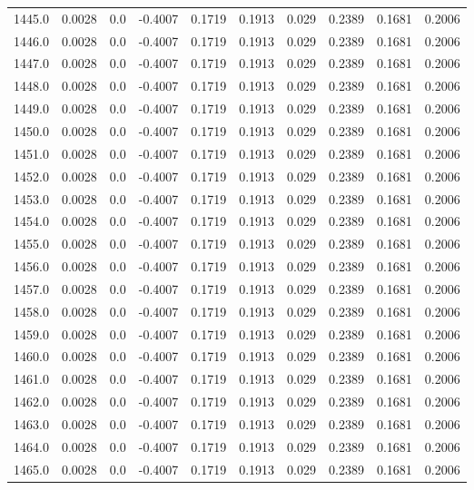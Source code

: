 \begin{longtable}{lrrrrrrrrr}
1445.0 & 0.0028 & 0.0 & -0.4007 & 0.1719 & 0.1913 & 0.029 & 0.2389 & 0.1681 & 0.2006 \\
1446.0 & 0.0028 & 0.0 & -0.4007 & 0.1719 & 0.1913 & 0.029 & 0.2389 & 0.1681 & 0.2006 \\
1447.0 & 0.0028 & 0.0 & -0.4007 & 0.1719 & 0.1913 & 0.029 & 0.2389 & 0.1681 & 0.2006 \\
1448.0 & 0.0028 & 0.0 & -0.4007 & 0.1719 & 0.1913 & 0.029 & 0.2389 & 0.1681 & 0.2006 \\
1449.0 & 0.0028 & 0.0 & -0.4007 & 0.1719 & 0.1913 & 0.029 & 0.2389 & 0.1681 & 0.2006 \\
1450.0 & 0.0028 & 0.0 & -0.4007 & 0.1719 & 0.1913 & 0.029 & 0.2389 & 0.1681 & 0.2006 \\
1451.0 & 0.0028 & 0.0 & -0.4007 & 0.1719 & 0.1913 & 0.029 & 0.2389 & 0.1681 & 0.2006 \\
1452.0 & 0.0028 & 0.0 & -0.4007 & 0.1719 & 0.1913 & 0.029 & 0.2389 & 0.1681 & 0.2006 \\
1453.0 & 0.0028 & 0.0 & -0.4007 & 0.1719 & 0.1913 & 0.029 & 0.2389 & 0.1681 & 0.2006 \\
1454.0 & 0.0028 & 0.0 & -0.4007 & 0.1719 & 0.1913 & 0.029 & 0.2389 & 0.1681 & 0.2006 \\
1455.0 & 0.0028 & 0.0 & -0.4007 & 0.1719 & 0.1913 & 0.029 & 0.2389 & 0.1681 & 0.2006 \\
1456.0 & 0.0028 & 0.0 & -0.4007 & 0.1719 & 0.1913 & 0.029 & 0.2389 & 0.1681 & 0.2006 \\
1457.0 & 0.0028 & 0.0 & -0.4007 & 0.1719 & 0.1913 & 0.029 & 0.2389 & 0.1681 & 0.2006 \\
1458.0 & 0.0028 & 0.0 & -0.4007 & 0.1719 & 0.1913 & 0.029 & 0.2389 & 0.1681 & 0.2006 \\
1459.0 & 0.0028 & 0.0 & -0.4007 & 0.1719 & 0.1913 & 0.029 & 0.2389 & 0.1681 & 0.2006 \\
1460.0 & 0.0028 & 0.0 & -0.4007 & 0.1719 & 0.1913 & 0.029 & 0.2389 & 0.1681 & 0.2006 \\
1461.0 & 0.0028 & 0.0 & -0.4007 & 0.1719 & 0.1913 & 0.029 & 0.2389 & 0.1681 & 0.2006 \\
1462.0 & 0.0028 & 0.0 & -0.4007 & 0.1719 & 0.1913 & 0.029 & 0.2389 & 0.1681 & 0.2006 \\
1463.0 & 0.0028 & 0.0 & -0.4007 & 0.1719 & 0.1913 & 0.029 & 0.2389 & 0.1681 & 0.2006 \\
1464.0 & 0.0028 & 0.0 & -0.4007 & 0.1719 & 0.1913 & 0.029 & 0.2389 & 0.1681 & 0.2006 \\
1465.0 & 0.0028 & 0.0 & -0.4007 & 0.1719 & 0.1913 & 0.029 & 0.2389 & 0.1681 & 0.2006 \\

\end{longtable}
